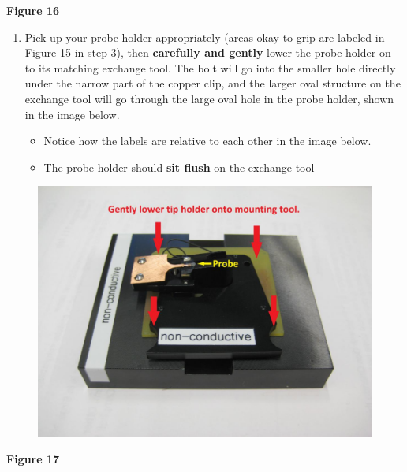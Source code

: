 \documentclass{../lab}
\begin{document}
\textbf{Figure 16}

\begin{enumerate}
    \item Pick up your probe holder appropriately (areas okay to grip are labeled in Figure 15 in step 3), then \textbf{carefully and gently} lower the probe holder on to its matching exchange tool.  The bolt will go into the smaller hole directly under the narrow part of the copper clip, and the larger oval structure on the exchange tool will go through the large oval hole in the probe holder, shown in the image below.
    \begin{itemize}
        \item Notice how the labels are relative to each other in the image below.

        \item The probe holder should \textbf{sit flush} on the exchange tool

    \end{itemize}

\end{enumerate}


\begin{figure}[h]
    \centering
    \href{http://dev-physicsadv.pantheon.berkeley.edu/sites/default/files/AFMImages/17.JPG}{\includegraphics[width=0.5\linewidth]{images/17.JPG}}
    \caption{}
    \label{fig:17}
\end{figure}

\textbf{Figure 17}
\end{document}
